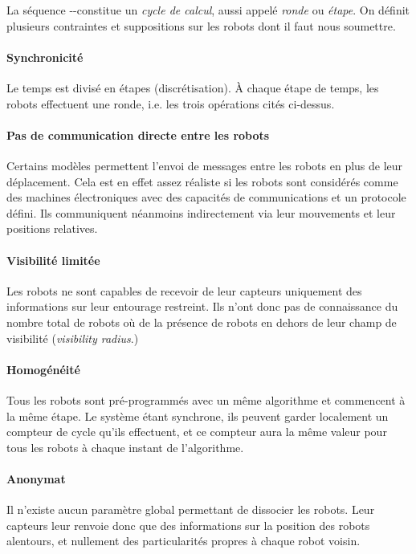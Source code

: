 La séquence \Observer-\Calculer-\SeDeplacer constitue un \textit{cycle de
calcul}, aussi appelé \textit{ronde} ou \textit{étape}. On définit plusieurs
contraintes et suppositions sur les robots dont il faut nous soumettre.

\paragraph{Synchronicité} Le temps est divisé en étapes (discrétisation). \`A
chaque étape de temps, les robots effectuent une ronde, i.e. les trois
opérations cités ci-dessus.

\paragraph{Pas de communication directe entre les robots} Certains modèles
permettent l'envoi de messages entre les robots en plus de leur déplacement.
Cela est en effet assez réaliste si les robots sont considérés comme des
machines électroniques avec des capacités de communications et un protocole
défini. Ils communiquent néanmoins indirectement via leur mouvements et leur
positions relatives.

\paragraph{Visibilité limitée} Les robots ne sont capables de recevoir de leur
capteurs uniquement des informations sur leur entourage restreint. Ils n'ont
donc pas de connaissance du nombre total de robots où de la présence de robots
en dehors de leur champ de visibilité (\textit{visibility radius}.)

\paragraph{Homogénéité} Tous les robots sont pré-programmés avec un même
algorithme et commencent à la même étape. Le système étant synchrone, ils
peuvent garder localement un compteur de cycle qu'ils effectuent, et ce
compteur aura la même valeur pour tous les robots à chaque instant de
l'algorithme.

\paragraph{Anonymat} Il n'existe aucun paramètre global permettant de dissocier
les robots. Leur capteurs leur renvoie donc que des informations sur la
position des robots alentours, et nullement des particularités propres à chaque
robot voisin.

